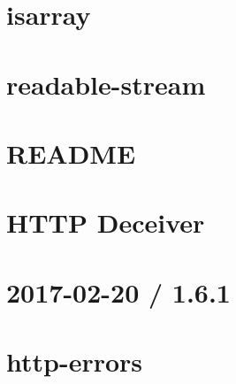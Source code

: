 \documentclass[twoside]{book}
\newcommand{\+}{\discretionary{\mbox{\scriptsize$\hookleftarrow$}}{}{}}
\begin{document}
\chapter{isarray}
\label{md__c_1_workspace_demo_src_main_script_node_modules_htmlparser2_node_modules_isarray__r_e_a_d_m_e}

\chapter{readable-\/stream}
\label{md__c_1_workspace_demo_src_main_script_node_modules_htmlparser2_node_modules_readable-stream__r_e_a_d_m_e}

\chapter{R\+E\+A\+D\+ME}
\label{md__c_1_workspace_demo_src_main_script_node_modules_htmlparser2__r_e_a_d_m_e}

\chapter{H\+T\+TP Deceiver}
\label{md__c_1_workspace_demo_src_main_script_node_modules_http-deceiver__r_e_a_d_m_e}

\chapter{2017-\/02-\/20 / 1.6.1}
\label{md__c_1_workspace_demo_src_main_script_node_modules_http-errors__h_i_s_t_o_r_y}

\chapter{http-\/errors}
\label{md__c_1_workspace_demo_src_main_script_node_modules_http-errors__r_e_a_d_m_e}

\end{document}
